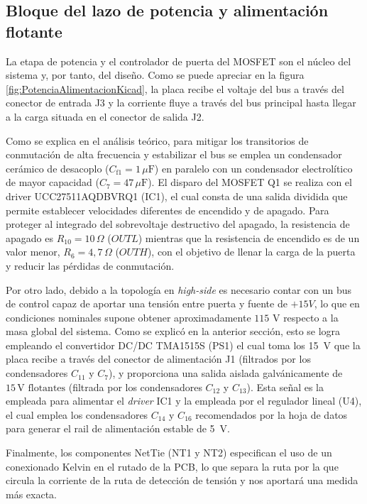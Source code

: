 \documentclass[12pt]{report} %
\begin{document}
\subsection{Bloque del lazo de potencia y alimentación flotante}
La etapa de potencia y el controlador de puerta del MOSFET son el núcleo del sistema y, por tanto, del diseño. Como se puede apreciar en la figura \ref{fig:PotenciaAlimentacionKicad}, la placa recibe el voltaje del bus a través del conector de entrada J3 y la corriente fluye a través del bus principal hasta llegar a la carga situada en el conector de salida J2. 

Como se explica en el análisis teórico, para mitigar los transitorios de conmutación de alta frecuencia y estabilizar el bus se emplea un condensador cerámico de desacoplo ($C_\text{f1} = 1\,\mu\text{F}$) en paralelo con un condensador electrolítico de mayor capacidad ($C_\text{7} = 47\,\mu\text{F}$). El disparo del MOSFET Q1 se realiza con el driver UCC27511AQDBVRQ1 (IC1), el cual consta de una salida dividida que permite establecer velocidades diferentes de encendido y de apagado. 
Para proteger al integrado del sobrevoltaje destructivo del apagado, la resistencia de apagado es $R_{10} = 10\,\Omega$ ($OUTL$) mientras que la resistencia de encendido es de un valor menor, $R_6 = 4{,}7\,\Omega$ ($OUTH$), con el objetivo de llenar la carga de la puerta y reducir las pérdidas de conmutación. 

Por otro lado, debido a la topología en \textit{high-side} es necesario contar con un bus de control capaz de aportar una tensión entre puerta y fuente de $+15 V$, lo que en condiciones nominales supone obtener aproximadamente $115$ V respecto a la masa global del sistema. Como se explicó en la anterior sección, esto se logra empleando el convertidor DC/DC TMA1515S (PS1) el cual toma los 15~V que la placa recibe a través del conector de alimentación J1 (filtrados por los condensadores $C_{11}$ y $C_{7}$), y proporciona una salida aislada galvánicamente de $15\,\text{V flotantes}$ (filtrada por los condensadores $C_{12}$ y $C_{13}$). Esta señal es la empleada para alimentar el \textit{driver} IC1 y la empleada por el regulador lineal (U4), el cual emplea los condensadores $C_{14}$ y $C_{16}$ recomendados por la hoja de datos \cite{stmicroelectronics_l78l05cd13tr_nodate} para generar el rail de alimentación estable de 5~V. 

Finalmente, los componentes NetTie (NT1 y NT2) especifican el uso de un conexionado Kelvin \cite{pcbsync_kelvin_2025} en el rutado de la PCB, lo que separa la ruta por la que circula la corriente de la ruta de detección de tensión y nos aportará una medida más exacta. 
\end{document}
